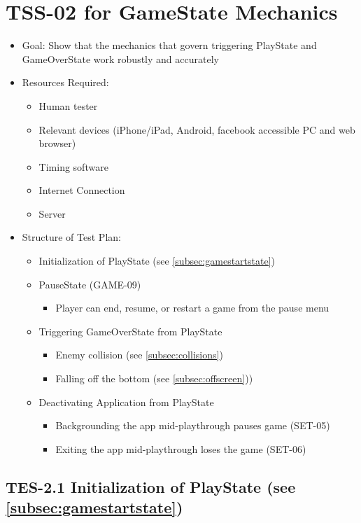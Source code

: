 \section{TSS-02 for GameState Mechanics}
\begin{itemize}
\item Goal: Show  that the mechanics that govern triggering PlayState and GameOverState work robustly and accurately

\item Resources Required:
\begin{itemize}
\item Human tester
\item Relevant devices (iPhone/iPad, Android, facebook accessible PC and web browser)
\item Timing software
\item Internet Connection 
\item Server
\end{itemize}

\item Structure of Test Plan: 
\begin{itemize}
\item Initialization of PlayState (see \ref{subsec:gamestartstate})
\item PauseState (GAME-09)
\begin{itemize}
\item Player can end, resume, or restart a game from the pause menu
\end{itemize}
\item Triggering GameOverState from PlayState
\begin{itemize}
\item Enemy collision (see \ref{subsec:collisions})
\item Falling off the bottom (see \ref{subsec:offscreen}))
\end{itemize}
\item Deactivating Application from PlayState
\begin{itemize}
\item Backgrounding the app mid-playthrough pauses game (SET-05)
\item Exiting the app mid-playthrough loses the game (SET-06)
\end{itemize}
\end{itemize}
\end{itemize}

\subsection{TES-2.1 Initialization of PlayState (see \ref{subsec:gamestartstate})}

